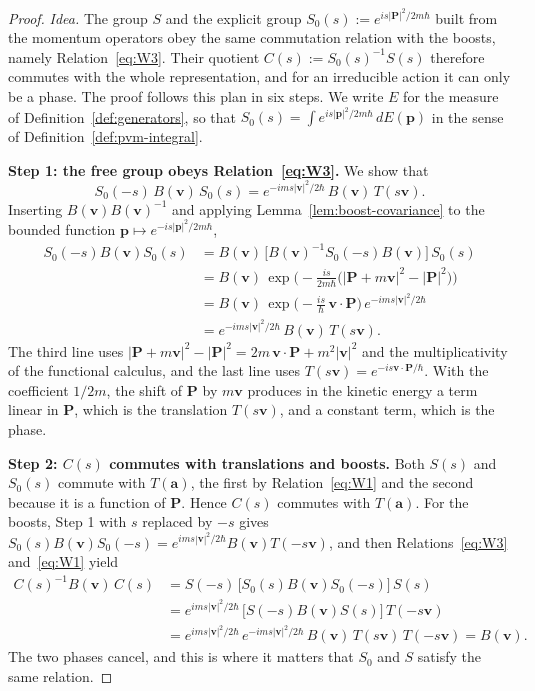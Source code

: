\begin{proof}
	\emph{Idea.} The group $S$ and the explicit group $S_0(s):=e^{is|\mathbf{P}|^2/2m\hbar}$ built from the momentum operators obey the same commutation relation with the boosts, namely Relation~\eqref{eq:W3}. Their quotient $C(s):=S_0(s)^{-1}S(s)$ therefore commutes with the whole representation, and for an irreducible action it can only be a phase. The proof follows this plan in six steps. We write $E$ for the measure of Definition~\ref{def:generators}, so that $S_0(s)=\int e^{is|\mathbf{p}|^2/2m\hbar}\,dE(\mathbf{p})$ in the sense of Definition~\ref{def:pvm-integral}.
	
	\medskip
	\noindent\textbf{Step 1: the free group obeys Relation~\eqref{eq:W3}.} We show that
	\begin{equation*}
		S_0(-s)\,B(\mathbf{v})\,S_0(s)=e^{-ims|\mathbf{v}|^2/2\hbar}\,B(\mathbf{v})\,T(s\mathbf{v}).
	\end{equation*}
	Inserting $B(\mathbf{v})B(\mathbf{v})^{-1}$ and applying Lemma~\ref{lem:boost-covariance} to the bounded function $\mathbf{p}\mapsto e^{-is|\mathbf{p}|^2/2m\hbar}$,
	\begin{align*}
		S_0(-s)B(\mathbf{v})S_0(s)
		&=B(\mathbf{v})\,\big[B(\mathbf{v})^{-1}S_0(-s)B(\mathbf{v})\big]\,S_0(s)\\
		&=B(\mathbf{v})\,\exp\!\Big(-\frac{is}{2m\hbar}\big(|\mathbf{P}+m\mathbf{v}|^2-|\mathbf{P}|^2\big)\Big)\\
		&=B(\mathbf{v})\,\exp\!\Big(-\frac{is}{\hbar}\,\mathbf{v}\cdot\mathbf{P}\Big)\,e^{-ims|\mathbf{v}|^2/2\hbar}\\
		&=e^{-ims|\mathbf{v}|^2/2\hbar}\,B(\mathbf{v})\,T(s\mathbf{v}).
	\end{align*}
	The third line uses $|\mathbf{P}+m\mathbf{v}|^2-|\mathbf{P}|^2=2m\,\mathbf{v}\cdot\mathbf{P}+m^2|\mathbf{v}|^2$ and the multiplicativity of the functional calculus, and the last line uses $T(s\mathbf{v})=e^{-is\mathbf{v}\cdot\mathbf{P}/\hbar}$. With the coefficient $1/2m$, the shift of $\mathbf{P}$ by $m\mathbf{v}$ produces in the kinetic energy a term linear in $\mathbf{P}$, which is the translation $T(s\mathbf{v})$, and a constant term, which is the phase.
	
	\medskip
	\noindent\textbf{Step 2: $C(s)$ commutes with translations and boosts.} Both $S(s)$ and $S_0(s)$ commute with $T(\mathbf{a})$, the first by Relation~\eqref{eq:W1} and the second because it is a function of $\mathbf{P}$. Hence $C(s)$ commutes with $T(\mathbf{a})$. For the boosts, Step 1 with $s$ replaced by $-s$ gives $S_0(s)B(\mathbf{v})S_0(-s)=e^{ims|\mathbf{v}|^2/2\hbar}B(\mathbf{v})T(-s\mathbf{v})$, and then Relations~\eqref{eq:W3} and~\eqref{eq:W1} yield
	\begin{align*}
		C(s)^{-1}B(\mathbf{v})\,C(s)
		&=S(-s)\,\big[S_0(s)B(\mathbf{v})S_0(-s)\big]\,S(s)\\
		&=e^{ims|\mathbf{v}|^2/2\hbar}\,\big[S(-s)B(\mathbf{v})S(s)\big]\,T(-s\mathbf{v})\\
		&=e^{ims|\mathbf{v}|^2/2\hbar}\,e^{-ims|\mathbf{v}|^2/2\hbar}\,B(\mathbf{v})\,T(s\mathbf{v})\,T(-s\mathbf{v})
		=B(\mathbf{v}).
	\end{align*}
	The two phases cancel, and this is where it matters that $S_0$ and $S$ satisfy the same relation.
	

\end{proof}
